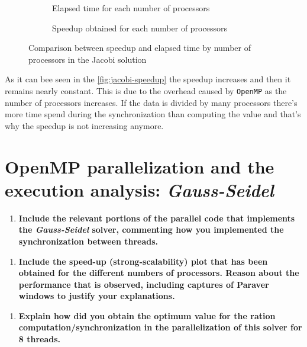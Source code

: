 \documentclass[a4paper]{article}
\newenvironment{questionenum}{%
\setlist[enumerate]{resume}
\restartlist{enumerate}
\newcommand{\question}[1]{
\begin{enumerate}
	\item\bfseries ##1
\end{enumerate}
}}{%
}
\begin{document}
\begin{questionenum}
	\begin{figure}[H]
		\begin{subfigure}[t]{0.49\textwidth}
			\caption{Elapsed time for each number of processors}
			\label{fig:jacobi-elapsed}
		\end{subfigure}
		\hfill
		\begin{subfigure}[t]{0.49\textwidth}		
			\caption{Speedup obtained for each number of processors}
			\label{fig:jacobi-speedup}
		\end{subfigure}
	\caption{Comparison between speedup and elapsed time by number of processors in the Jacobi solution}
	\end{figure}
\end{questionenum}

As it can bee seen in the \autoref{fig:jacobi-speedup} the speedup increases and then it remains nearly constant. This is due to the overhead caused by \texttt{OpenMP} as the number of processors increases. If the data is divided by many processors there's more time spend during the synchronization than computing the value and that's why the speedup is not increasing anymore.

\section{OpenMP parallelization and the execution analysis: \emph{Gauss-Seidel}}
\begin{questionenum}
	\question{Include the relevant portions of the parallel code that implements the \emph{Gauss-Seidel} solver, commenting how you implemented the synchronization between threads.}
	
	\question{Include the speed-up (strong-scalability) plot that has been obtained for the different numbers of processors. Reason about the performance that is observed, including captures of Paraver windows to justify your explanations.}
	
	\question{Explain how did you obtain the optimum value for the ration computation/synchronization in the parallelization of this solver for 8 threads.}
\end{questionenum}
\end{document}
